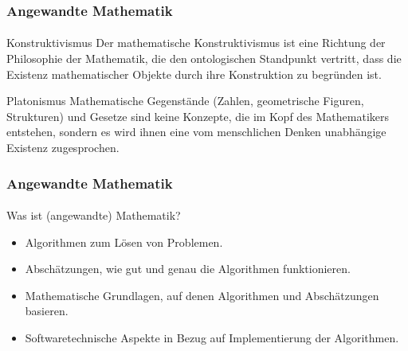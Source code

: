 \documentclass{beamer}
\begin{document}
\begin{frame}
    \frametitle{Angewandte Mathematik}
\framesubtitle{}
    \begin{block}{Konstruktivismus}
 Der mathematische Konstruktivismus ist eine Richtung der Philosophie der Mathematik, die den ontologischen Standpunkt vertritt, dass die Existenz mathematischer Objekte durch ihre Konstruktion zu begründen ist. 
\end{block}
    \begin{block}{Platonismus}
Mathematische Gegenstände (Zahlen, geometrische Figuren, Strukturen) und Gesetze sind keine Konzepte, die im Kopf des Mathematikers entstehen, sondern es wird ihnen eine vom menschlichen Denken unabhängige Existenz zugesprochen.
\end{block}
 \end{frame}


\begin{frame}
    \frametitle{Angewandte Mathematik}
\framesubtitle{}
    \begin{block}{Was ist (angewandte) Mathematik?}
\begin{itemize}
\pause \item Algorithmen zum Lösen von Problemen.
\pause \item Abschätzungen, wie gut und genau die Algorithmen funktionieren.
\pause \item Mathematische Grundlagen, auf denen Algorithmen und Abschätzungen basieren. 
\pause \item Softwaretechnische Aspekte in Bezug auf  Implementierung der Algorithmen.
\end{itemize}
\end{block}
 \end{frame}
\end{document}
